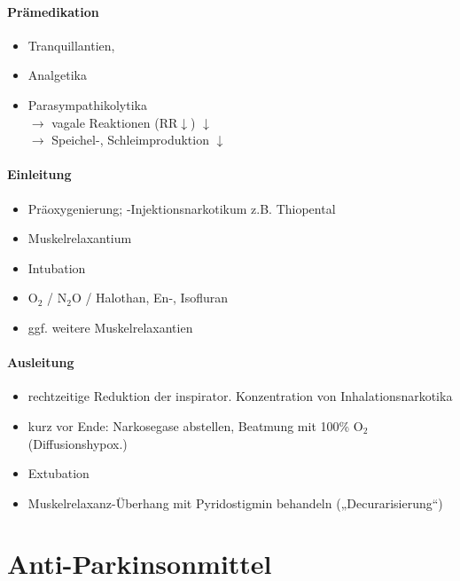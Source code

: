 \documentclass[10pt,a4paper]{report}
\begin{document}
\subsubsection{Prämedikation} %
\label{ssub:pr_medikation}
\begin{itemize}
	\item Tranquillantien, 
	\item Analgetika
	\item Parasympathikolytika\\
	$\rightarrow$ vagale Reaktionen (RR$\downarrow$) $\downarrow$\\
	$\rightarrow$ Speichel-, Schleimproduktion $\downarrow$
\end{itemize}
\subsubsection{Einleitung} %
\label{ssub:einleitung}
\begin{itemize}
	\item Präoxygenierung; -Injektionsnarkotikum z.B. Thiopental
	\item Muskelrelaxantium
	\item Intubation
	\item O$_2$ / N$_2$O / Halothan, En-, Isofluran
	\item ggf. weitere Muskelrelaxantien
\end{itemize}
\subsubsection{Ausleitung} %
\label{ssub:ausleitung}
\begin{itemize}
	\item rechtzeitige Reduktion der inspirator. Konzentration von Inhalationsnarkotika
	\item kurz vor Ende: Narkosegase abstellen, Beatmung mit 100\% O$_2$   (Diffusionshypox.)
	\item Extubation
	\item Muskelrelaxanz-Überhang mit Pyridostigmin behandeln („Decurarisierung“)
\end{itemize}
\chapter{Anti-Parkinsonmittel} %
\label{cha:anti_parkinsonmittel}
\end{document}

